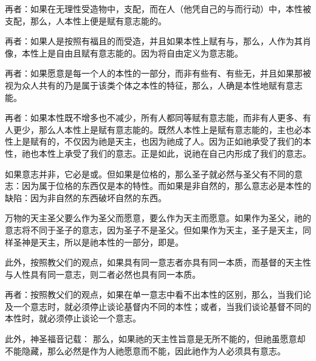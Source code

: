 再者：如果在无理性受造物中，支配，而在人（他凭自己的与而行动）中，本性被支配，那么，人本性上便是赋有意志能的。\par

再者：如果人是按照有福且的而受造，并且如果本性上赋有与，那么，人作为其肖像，本性上是自由且赋有意志能的。因为将自由定义为意志能。\par

再者：如果愿意是每一个人的本性的一部分，而非有些有、有些无，并且如果那被视为众人共有的乃是属于该类个体之本性的特征，那么，人确是本性地赋有意志能。\par

再者：如果本性既不增多也不减少，所有人都同等赋有意志能，而非有人更多、有人更少，那么人本性上是赋有意志能的。既然人本性上是赋有意志能的，主也必本性上是赋有的，不仅因为祂是天主，也因为祂成了人。因为正如祂承受了我们的本性，祂也本性上承受了我们的意志。正是如此，说祂在自己内形成了我们的意志。\par

如果意志并非，它必是或。但如果是位格的，那么圣子就必然与圣父有不同的意志：因为属于位格的东西仅是本的特性。而如果是非自然的，那么意志必是本性的缺陷：因为非自然的东西破坏自然的东西。\par

万物的天主圣父要么作为圣父而愿意，要么作为天主而愿意。如果作为圣父，祂的意志将不同于圣子的意志，因为圣子不是圣父。但如果作为天主，圣子是天主，同样圣神是天主，所以是祂本性的一部分，即是。\par

此外，按照教父们的观点，如果具有同一意志者亦具有同一本质，而基督的天主性与人性具有同一意志，则二者必然也具有同一本质。\par

再者：按照教父们的观点，如果在单一意志中看不出本性的区别，那么，当我们论及一个意志时，就必须停止谈论基督内不同的本性；或者，当我们谈论基督不同的本性时，就必须停止谈论一个意志。\par

此外，神圣福音记载： 那么，如果祂的天主性旨意是无所不能的，但祂虽愿意却不能隐藏，那么必然是作为人祂愿意而不能，因此祂作为人必须具有意志。\par

